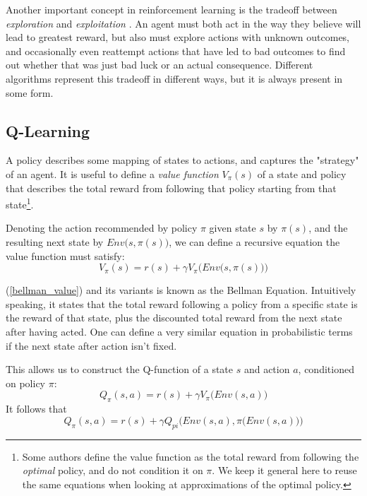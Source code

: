 Another important concept in reinforcement learning is the tradeoff between \textit{exploration} and \textit{exploitation} \cite[Chapter 2.1]{Sutton}. An agent must both act in the way they believe will lead to greatest reward, but also must explore actions with unknown outcomes, and occasionally even reattempt actions that have led to bad outcomes to find out whether that was just bad luck or an actual consequence. Different algorithms represent this tradeoff in different ways, but it is always present in some form.

\subsection{Q-Learning}
A policy describes some mapping of states to actions, and captures the "strategy" of an agent. It is useful to define a \textit{value function} $V_{\pi}(s)$ of a state and policy that describes the total reward from following that policy starting from that state\footnote{Some authors define the value function as the total reward from following the \textit{optimal} policy, and do not condition it on $\pi$. We keep it general here to reuse the same equations when looking at approximations of the optimal policy.}.

Denoting the action recommended by policy $\pi$ given state $s$ by $\pi(s)$, and the resulting next state by $Env\big(s, \pi(s)\big)$, we can define a recursive equation the value function must satisfy:
\begin{equation}
\label{bellman_value}
    V_{\pi}(s) = r(s) + \gamma V_{\pi} \Big(Env\big(s, \pi(s)\big)\Big)
\end{equation}

(\ref{bellman_value}) and its variants is known as the Bellman Equation. Intuitively speaking, it states that the total reward following a policy from a specific state is the reward of that state, plus the discounted total reward from the next state after having acted. One can define a very similar equation in probabilistic terms if the next state after action isn't fixed.

This allows us to construct the Q-function of a state $s$ and action $a$, conditioned on policy $\pi$:
\begin{equation}
    Q_{\pi}(s, a) = r(s) + \gamma V_{\pi}\big(Env(s, a)\big)
\end{equation}
It follows that
\begin{equation}
\label{bellman_q}
    Q_{\pi}(s, a) = r(s) + \gamma Q_{pi}\Big(Env(s, a), \pi\big(Env(s, a)\big)\Big)
\end{equation}

